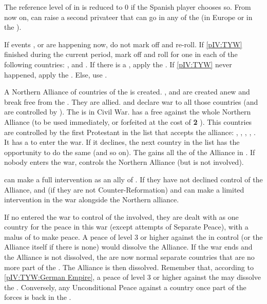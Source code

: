 \aparag The reference level of \paysGenes in \CTZ \SPA is reduced to 0 if the
Spanish player chooses so.
\aparag From now on, \SPA can raise a second privateer that can go in any \STZ
of the  (in Europe or in the \ROTW).





\aparag If events , 
or  are happening now, do not mark off and re-roll.
\aparag If \ref{pIV:TYW} finished during the current period, mark off and roll
for one \REVOLT in each of the following countries: \AUT, and \FRA.
\aparag If there is a \GE, apply the .
\aparag If \ref{pIV:TYW} never happened, apply the
.
\aparag Else, use .



\phevnt
\aparag A Northern Alliance of countries of the \HRE is created. \PRUMin,
\paysSaxe and \payspalatinat are created anew and break free from the
\GE. They are allied.
\aparag \GE and \hab declare war to all those countries (and are controlled by
\SPA). The \GE is in Civil War.
\bparag \AUS has a free \CB against the whole Northern Alliance (to be used
immediately, or forfeited at the cost of {\bf 2} \STAB).
\aparag This countries are controlled by the first Protestant \MAJ in the list
that accepts the alliance: \SUE, \ENG, \HOL, \FRA, \POL.  It has a \CB to
enter the war. If it declines, the next country in the list has the
opportunity to do the same (and so on).  The \MAJ gains all the \MIN of the
Alliance in \EG.  If nobody enters the war, \SUE controls the Northern
Alliance (but is not involved).

\phdipl
\aparag \SPA can make a full intervention as an ally of \HAB.
\aparag If they have not declined control of the Alliance, \FRA and \ENG (if
they are not Counter-Reformation) and \SUE can make a limited intervention in
the war alongside the Northern alliance.

\phpaix
\aparag If no \MAJ entered the war to control of the \MIN involved, they are
dealt with as one country for the peace in this war (except attempts of
Separate Peace), with a malus of  to make peace.
\aparag A peace of level 3 or higher against the \MAJ in control (or the
Alliance itself if there is none) would dissolve the Alliance.
\aparag If the war ends and the Alliance is not dissolved, the \MIN are now
normal separate countries that are no more part of the \GE. The Alliance is
then dissolved.
\aparag Remember that, according to \ref{pIV:TYW:German Empire}, a peace of
level 3 or higher against the \MAJHAB may dissolve the \GE.  Conversely, any
Unconditional Peace against a country once part of the \GE forces is back in
the \GE.


